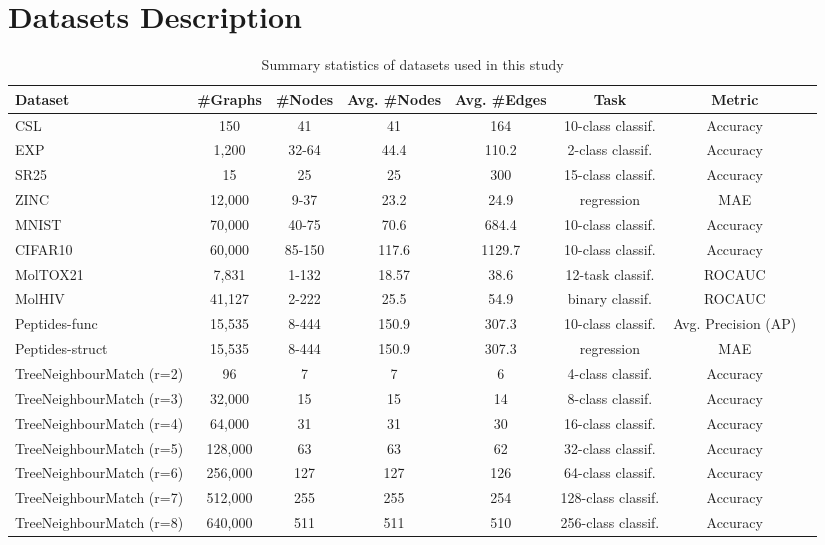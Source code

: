 \documentclass{article}
\begin{document}
\section{Datasets Description}\label{app_sec: Datasets description}
\begin{table}[!ht]
\caption{Summary statistics of datasets used in this study}
\footnotesize
    \centering
    \begin{tabular}{lccccccc}
    \toprule
    Dataset     &  \#Graphs & \#Nodes & Avg. \#Nodes & Avg. \#Edges & Task & Metric\\
    \midrule
    CSL & 150 & 41 & 41 & 164 & 10-class classif. & Accuracy\\
    EXP & 1,200 & 32-64 & 44.4 & 110.2 & 2-class classif. & Accuracy\\
    {SR25} & {15} & {25} & {25} &{300} & {15-class classif.} & {Accuracy} \\
    \midrule
         ZINC & 12,000 & 9-37 & 23.2 & 24.9 & regression & MAE \\
         MNIST & 70,000 & 40-75 & 70.6 & 684.4 & 10-class classif. & Accuracy \\
         CIFAR10 & 60,000 & 85-150 & 117.6 & 1129.7 & 10-class classif. & Accuracy\\
    \midrule
        MolTOX21 & 7,831 & 1-132 & 18.57 & 38.6 & 12-task classif. & ROCAUC\\
         MolHIV & 41,127 & 2-222 & 25.5 & 54.9 & binary classif. & ROCAUC \\
    \midrule
         {Peptides-func} 
         & {15,535} 
         & {8-444} 
         & {150.9} 
         & {307.3} 
         & {10-class classif.} 
         & {Avg. Precision (AP)} \\
         {Peptides-struct} 
         & {15,535} 
         & {8-444} 
         & {150.9} 
         & {307.3} 
         & {regression} 
         & {MAE} \\
    \midrule
         TreeNeighbourMatch (r=2)
         &96 &7 &7 &6 & 4-class classif. & Accuracy \\
         TreeNeighbourMatch (r=3)
         & 32,000 & 15 & 15 & 14 & 8-class classif. & Accuracy\\
         TreeNeighbourMatch (r=4)
         & 64,000 & 31 & 31 & 30 & 16-class classif. & Accuracy\\
         TreeNeighbourMatch (r=5)
         & 128,000 & 63 & 63 & 62 & 32-class classif. & Accuracy\\
         TreeNeighbourMatch (r=6)
         & 256,000 & 127 & 127 & 126 & 64-class classif. & Accuracy\\
         TreeNeighbourMatch (r=7)
         & 512,000 & 255 & 255 & 254 & 128-class classif. & Accuracy\\
         TreeNeighbourMatch (r=8)
         & 640,000 & 511 & 511 & 510 & 256-class classif. & Accuracy\\
    \bottomrule
    \end{tabular}
    \label{tab: datasets}
\end{table}
\end{document}
